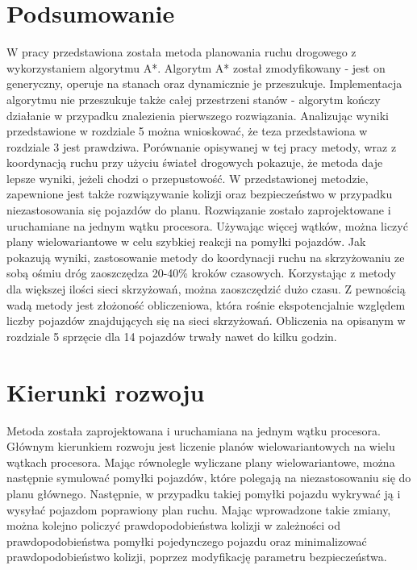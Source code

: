  \label{chap:conclusions}

\section {Podsumowanie}

W pracy przedstawiona została metoda planowania ruchu drogowego z wykorzystaniem algorytmu A*. Algorytm A* został zmodyfikowany - jest on generyczny, operuje na stanach oraz dynamicznie je przeszukuje. Implementacja algorytmu nie przeszukuje także całej przestrzeni stanów - algorytm kończy działanie w przypadku znalezienia pierwszego rozwiązania.
\newline
\indent
Analizując wyniki przedstawione w rozdziale 5 można wnioskować, że teza przedstawiona w rozdziale 3 jest prawdziwa. Porównanie opisywanej w tej pracy metody, wraz z koordynacją ruchu przy użyciu świateł drogowych pokazuje, że metoda daje lepsze wyniki, jeżeli chodzi o przepustowość. W przedstawionej metodzie, zapewnione jest także rozwiązywanie kolizji oraz bezpieczeństwo w przypadku niezastosowania się pojazdów do planu. Rozwiązanie zostało zaprojektowane i uruchamiane na jednym wątku procesora. Używając więcej wątków, można liczyć plany wielowariantowe w celu szybkiej reakcji na pomyłki pojazdów.
\newline
\indent
Jak pokazują wyniki, zastosowanie metody do koordynacji ruchu na skrzyżowaniu ze sobą ośmiu dróg zaoszczędza 20-40\% kroków czasowych. Korzystając z metody dla większej ilości sieci skrzyżowań, można zaoszczędzić dużo czasu.
\newline
\indent
Z pewnością wadą metody jest złożoność obliczeniowa, która rośnie ekspotencjalnie względem liczby pojazdów znajdujących się na sieci skrzyżowań. Obliczenia na opisanym w rozdziale 5 sprzęcie dla 14 pojazdów trwały nawet do kilku godzin.

\section{Kierunki rozwoju}

Metoda została zaprojektowana i uruchamiana na jednym wątku procesora. Głównym kierunkiem rozwoju jest liczenie planów wielowariantowych na wielu wątkach procesora. Mając równolegle wyliczane plany wielowariantowe, można następnie symulować pomyłki pojazdów, które polegają na niezastosowaniu się do planu głównego. Następnie, w przypadku takiej pomyłki pojazdu wykrywać ją i wysyłać pojazdom poprawiony plan ruchu. Mając wprowadzone takie zmiany, można kolejno policzyć prawdopodobieństwa kolizji w zależności od prawdopodobieństwa pomyłki pojedynczego pojazdu oraz minimalizować prawdopodobieństwo kolizji, poprzez modyfikację parametru bezpieczeństwa.
